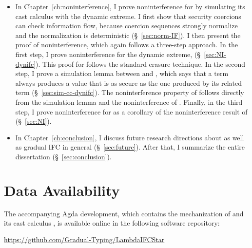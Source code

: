 {\begin{itemize}
    between more and less precise security coercion sequences
    (\S~\ref{sec:sim-cexpr}). I then prove another simulation lemma, between \CC
    terms of different precision (\S~\ref{sec:simulation}). I also prove that
    compiling from \Surface to \CC preserves precision. Finally, I prove the
    gradual guarantee of \Surface by using the simulation lemma of \CC
    (\S~\ref{sec:gg}).
  \item In Chapter~\ref{ch:noninterference}, I prove noninterference for
    \Surface by simulating its cast calculus with the dynamic extreme. I first
    show that security coercions can check information flow, because coercion
    sequences strongly normalize and the normalization is deterministic
    (\S~\ref{sec:norm-IF}). I then present the proof of noninterference, which
    again follows a three-step approach. In the first step, I prove
    noninterference for the dynamic extreme, \DynIFC (\S~\ref{sec:NI-dynifc}).
    This proof for \DynIFC follows the standard erasure technique. In the second
    step, I prove a simulation lemma between \CC and \DynIFC, which says that a
    \CC term always produces a value that is as secure as the one produced by
    its related \DynIFC term (\S~\ref{sec:sim-cc-dynifc}). The noninterference
    property of \CC follows directly from the simulation lemma and the
    noninterference of \DynIFC. Finally, in the third step, I prove
    noninterference for \Surface as a corollary of the noninterference result of
    \CC (\S~\ref{sec:NI}).
  \item In Chapter~\ref{ch:conclusion}, I discuss future research directions
    about \Surface as well as gradual IFC in general (\S~\ref{sec:future}).
    After that, I summarize the entire dissertation (\S~\ref{sec:conclusion}).
\end{itemize}

\section{Data Availability}

The accompanying Agda development, which contains the mechanization of \Surface and its
cast calculus \CC, is available online in the following software repository:
\begin{center}
  \large
  \url{https://github.com/Gradual-Typing/LambdaIFCStar}
\end{center}
}%
